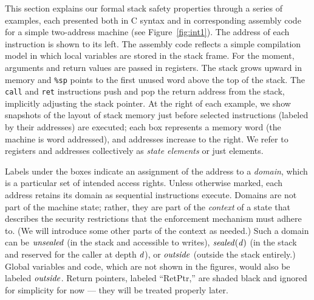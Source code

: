 \documentclass[10pt,conference]{ieeetran}%
\theoremstyle{definition}
\begin{document}
This section explains our formal stack safety properties through a series
of examples, each presented both in C syntax and in corresponding assembly code for a
simple two-address machine (see Figure~\ref{fig:int1}).
The address of each instruction is shown to its left.
The assembly code reflects a simple compilation model in which
local variables are stored in the stack frame.
For the moment, arguments and return values are passed in registers.
The stack grows upward in
memory and {\tt \%sp} points to the first unused word above the top of the stack.
The {\tt call} and {\tt ret} instructions push and pop the return address from the stack,
implicitly adjusting the stack pointer.
At the right of each example, we show snapshots of the layout of stack memory just before
selected instructions (labeled by their addresses) are executed; each box represents a memory word
(the machine is word addressed), and addresses increase to the right.
We refer to registers and addresses collectively as {\em state elements} or just elements.

Labels under the boxes indicate an assignment of the address to a
{\em domain}, which is a particular set of intended access
rights. Unless otherwise marked, each address retains its domain as
sequential instructions execute. %
Domains are not part of the machine state; rather, they are part
of the {\em context} of a state that describes the security restrictions
that the enforcement mechanism must adhere to.
(We will introduce some other parts of the context as needed.)
Such a domain
can be \(\mathit{unsealed}\) (in the stack and accessible to writes), \(\mathit{sealed(d)}\)
(in the stack and reserved for the caller at depth \(d\)), or \(\mathit{outside}\)
(outside the stack entirely.)
Global variables and code, which are not shown in the figures, would
also be labeled \(\mathit{outside}\). Return pointers, labeled ``RetPtr,''
are shaded black and ignored for simplicity for now --- they will
be treated properly later.
\end{document}
